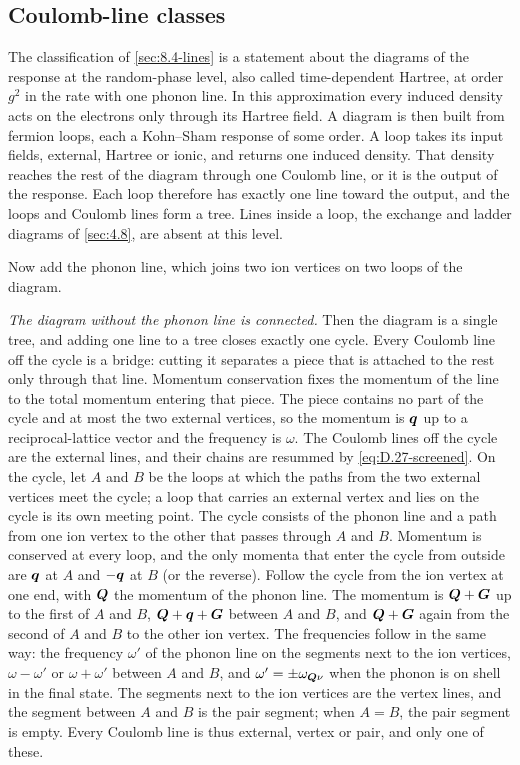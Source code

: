 \subsection{Coulomb-line classes}

The classification of \cref{sec:8.4-lines} is a statement about the diagrams of the response at the random-phase level, also called time-dependent Hartree, at order $g^2$ in the rate with one phonon line. In this approximation every induced density acts on the electrons only through its Hartree field. A diagram is then built from fermion loops, each a Kohn--Sham response of some order. A loop takes its input fields, external, Hartree or ionic, and returns one induced density. That density reaches the rest of the diagram through one Coulomb line, or it is the output of the response. Each loop therefore has exactly one line toward the output, and the loops and Coulomb lines form a tree. Lines inside a loop, the exchange and ladder diagrams of \cref{sec:4.8}, are absent at this level.

Now add the phonon line, which joins two ion vertices on two loops of the diagram.

\emph{The diagram without the phonon line is connected.} Then the diagram is a single tree, and adding one line to a tree closes exactly one cycle. Every Coulomb line off the cycle is a bridge: cutting it separates a piece that is attached to the rest only through that line. Momentum conservation fixes the momentum of the line to the total momentum entering that piece. The piece contains no part of the cycle and at most the two external vertices, so the momentum is $\bm{q}$ up to a reciprocal-lattice vector and the frequency is $\omega$. The Coulomb lines off the cycle are the external lines, and their chains are resummed by \cref{eq:D.27-screened}. On the cycle, let $A$ and $B$ be the loops at which the paths from the two external vertices meet the cycle; a loop that carries an external vertex and lies on the cycle is its own meeting point. The cycle consists of the phonon line and a path from one ion vertex to the other that passes through $A$ and $B$. Momentum is conserved at every loop, and the only momenta that enter the cycle from outside are $\bm{q}$ at $A$ and $-\bm{q}$ at $B$ (or the reverse). Follow the cycle from the ion vertex at one end, with $\bm{Q}$ the momentum of the phonon line. The momentum is $\bm{Q} + \bm{G}$ up to the first of $A$ and $B$, $\bm{Q} + \bm{q} + \bm{G}$ between $A$ and $B$, and $\bm{Q} + \bm{G}$ again from the second of $A$ and $B$ to the other ion vertex. The frequencies follow in the same way: the frequency $\omega'$ of the phonon line on the segments next to the ion vertices, $\omega - \omega'$ or $\omega + \omega'$ between $A$ and $B$, and $\omega' = \pm\omega_{\bm{Q}\nu}$ when the phonon is on shell in the final state. The segments next to the ion vertices are the vertex lines, and the segment between $A$ and $B$ is the pair segment; when $A = B$, the pair segment is empty. Every Coulomb line is thus external, vertex or pair, and only one of these.

